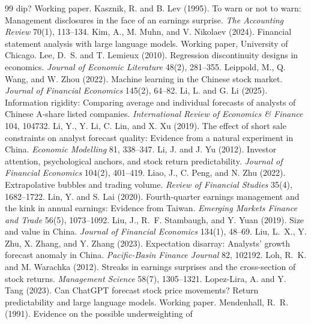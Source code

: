 \documentclass[10pt]{article}
\begin{document}
\begin{thebibliography}{99}
dip? Working paper.
 Kasznik, R. and B. Lev (1995). To warn or not to warn: Management
disclosures in the face of an earnings surprise. \emph{The Accounting Review} 70(1), 113--134.
 Kim, A., M. Muhn, and V. Nikolaev (2024). Financial statement analysis with
large language models. Working paper, University of Chicago.
 Lee, D.~S. and T. Lemieux (2010). Regression discontinuity designs in
economics. \emph{Journal of Economic Literature} 48(2), 281--355.
 Leippold, M., Q. Wang, and W. Zhou (2022). Machine learning in the
Chinese stock market. \emph{Journal of Financial Economics} 145(2), 64--82.
 Li, L. and G. Li (2025). Information rigidity: Comparing average and individual
forecasts of analysts of Chinese A-share listed companies. \emph{International Review of Economics \& Finance} 104,
104732.
 Li, Y., Y. Li, C. Lin, and X. Xu (2019). The effect of short sale constraints on
analyst forecast quality: Evidence from a natural experiment in China. \emph{Economic Modelling} 81, 338--347.
 Li, J. and J. Yu (2012). Investor attention, psychological anchors, and stock
return predictability. \emph{Journal of Financial Economics} 104(2), 401--419.
 Liao, J., C. Peng, and N. Zhu (2022). Extrapolative bubbles and trading volume.
\emph{Review of Financial Studies} 35(4), 1682--1722.
 Lin, Y. and S. Lai (2020). Fourth-quarter earnings management and the kink in
annual earnings: Evidence from Taiwan. \emph{Emerging Markets Finance and Trade} 56(5), 1073--1092.
 Liu, J., R.~F. Stambaugh, and Y. Yuan (2019). Size and value in China.
\emph{Journal of Financial Economics} 134(1), 48--69.
 Liu, L.~X., Y. Zhu, X. Zhang, and Y. Zhang (2023). Expectation disarray:
Analysts' growth forecast anomaly in China. \emph{Pacific-Basin Finance Journal} 82, 102192.
 Loh, R.~K. and M. Warachka (2012). Streaks in earnings surprises and the
cross-section of stock returns. \emph{Management Science} 58(7), 1305--1321.
 Lopez-Lira, A. and Y. Tang (2023). Can ChatGPT forecast stock price
movements? Return predictability and large language models. Working paper.
 Mendenhall, R.~R. (1991). Evidence on the possible underweighting of

\end{thebibliography}
\end{document}

